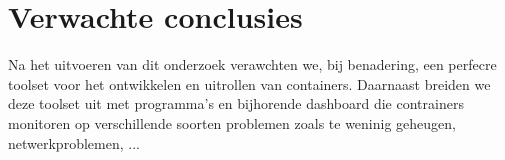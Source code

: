 \section{Verwachte conclusies}
\label{sec:verwachte_conclusies}

Na het uitvoeren van dit onderzoek verawchten we, bij benadering, een perfecre toolset voor het ontwikkelen en uitrollen van containers. Daarnaast breiden we deze toolset uit met programma's en bijhorende dashboard die contrainers monitoren op verschillende soorten problemen zoals te weninig geheugen, netwerkproblemen, ... 

